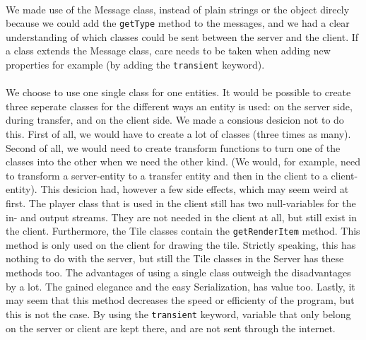 \documentclass[../main.tex]{subfiles}
\begin{document}
    \paragraph{}
    We made use of the Message class, instead of plain strings or the object direcly because we could add the \texttt{getType} method to the messages, and we had a clear understanding of which classes could be sent between the server and the client. If a class extends the Message class, care needs to be taken when adding new properties for example (by adding the \texttt{transient} keyword).
    \paragraph{}
    We choose to use one single class for one entities. It would be possible to create three seperate classes for the different ways an entity is used: on the server side, during transfer, and on the client side. We made a consious desicion not to do this. First of all, we would have to create a lot of classes (three times as many). Second of all, we would need to create transform functions to turn one of the classes into the other when we need the other kind. (We would, for example, need to transform a server-entity to a transfer entity and then in the client to a client-entity). This desicion had, however a few side effects, which may seem weird at first. The player class that is used in the client still has two null-variables for the in- and output streams. They are not needed in the client at all, but still exist in the client. Furthermore, the Tile classes contain the \texttt{getRenderItem} method. This method is only used on the client for drawing the tile. Strictly speaking, this has nothing to do with the server, but still the Tile classes in the Server has these methods too. The advantages of using a single class outweigh the disadvantages by a lot. The gained elegance and the easy Serialization, has value too. Lastly, it may seem that this method decreases the speed or efficienty of the program, but this is not the case. By  using the \texttt{transient} keyword, variable that only belong on the server or client are kept there, and are not sent through the internet.
    \paragraph{}
    
\end{document}
